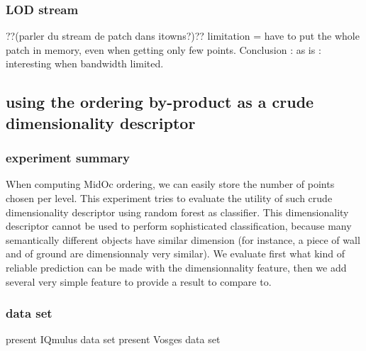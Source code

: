 		\subsubsection{LOD stream}
			??(parler du stream de patch dans itowns?)??
			limitation = have to put the whole patch in memory, even when getting only few points.
			Conclusion : as is : interesting when bandwidth limited.  
	\subsection{using the ordering by-product as a crude dimensionality descriptor}
		\subsubsection{experiment summary}
			When computing MidOc ordering, we can easily store the number of points chosen per level.
			This experiment tries to evaluate the utility of such crude dimensionality descriptor using random forest as classifier.
			This dimensionality descriptor cannot be used to perform sophisticated classification, because many semantically different objects have similar dimension (for instance, a piece of wall and of ground are dimensionnaly very similar).
			We evaluate first what kind of reliable prediction can be made with the dimensionnality feature,
			then we add several very simple feature to provide a result to compare to.
			
			
		\subsubsection{data set}
			present IQmulus data set
			present Vosges data set
		\subsubsection{}
		
 